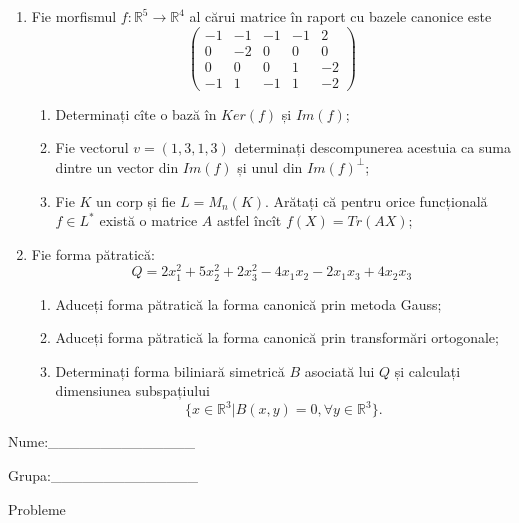 \documentclass{article}
\begin{document}
\begin{enumerate}
 \item Fie morfismul $f:\mathbb{R}^5 \to \mathbb{R}^4$ al cărui matrice în raport cu bazele canonice este
$$\begin{pmatrix}
-1&-1&-1&-1&2\\
0&-2&0&0&0\\
0&0&0&1&-2\\
-1&1&-1&1&-2
\end{pmatrix}$$

\begin{enumerate}
\item Determinați cîte o bază în $Ker(f)$ și $Im(f)$;
\item Fie vectorul $v=(1,3,1,3)$ determinați descompunerea acestuia ca suma dintre un vector din $Im(f)$ și unul din $Im(f)^\perp$;
\item Fie $K$ un corp și fie $L=M_n(K)$. Arătați că pentru orice funcțională $f \in L^*$ există o matrice $A$ astfel încît $f(X)=Tr(AX)$;
\end{enumerate}
\item Fie forma pătratică:
$$Q= 2x_1^2+5x_2^2+2x_3^2-4x_1x_2-2x_1x_3+4x_2x_3$$

\begin{enumerate}
\item Aduceți forma pătratică la forma canonică prin metoda Gauss;
\item Aduceți forma pătratică la forma canonică prin transformări ortogonale;
\item Determinați forma biliniară simetrică $B$ asociată lui $Q$ și calculați dimensiunea subspațiului
$$\{x \in \mathbb{R}^3 | B(x,y)=0,\forall y \in \mathbb{R}^3\}.$$

\end{enumerate}
\end{enumerate}
\newpage
\begin{flushright}
Nume:\_\_\_\_\_\_\_\_\_\_\_\_\_\_
 
 
Grupa:\_\_\_\_\_\_\_\_\_\_\_\_\_\_
\end{flushright}
\begin{center}
\vspace{2cm}
{\Large Probleme}
\vspace{2cm}
\end{center}
\end{document}
